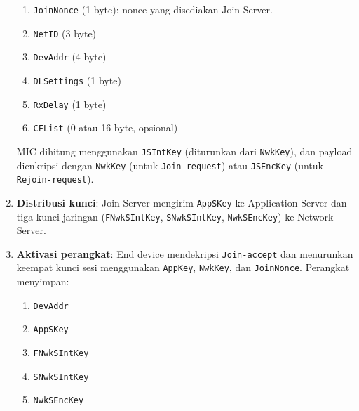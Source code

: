 \begin{enumerate}
          \begin{enumerate}
              \item \texttt{JoinNonce} (1 byte): nonce yang disediakan Join Server.
              \item \texttt{NetID} (3 byte)
              \item \texttt{DevAddr} (4 byte)
              \item \texttt{DLSettings} (1 byte)
              \item \texttt{RxDelay} (1 byte)
              \item \texttt{CFList} (0 atau 16 byte, opsional)
          \end{enumerate}
          MIC dihitung menggunakan \texttt{JSIntKey} (diturunkan dari \texttt{NwkKey}), dan payload dienkripsi dengan \texttt{NwkKey} (untuk \texttt{Join-request}) atau \texttt{JSEncKey} (untuk \texttt{Rejoin-request}).
    \item \textbf{Distribusi kunci}: Join Server mengirim \texttt{AppSKey} ke Application Server dan tiga kunci jaringan (\texttt{FNwkSIntKey}, \texttt{SNwkSIntKey}, \texttt{NwkSEncKey}) ke Network Server.
    \item \textbf{Aktivasi perangkat}: End device mendekripsi \texttt{Join-accept} dan menurunkan keempat kunci sesi menggunakan \texttt{AppKey}, \texttt{NwkKey}, dan \texttt{JoinNonce}. Perangkat menyimpan:
          \begin{enumerate}
              \item \texttt{DevAddr}
              \item \texttt{AppSKey}
              \item \texttt{FNwkSIntKey}
              \item \texttt{SNwkSIntKey}
              \item \texttt{NwkSEncKey}
          \end{enumerate}
\end{enumerate}
